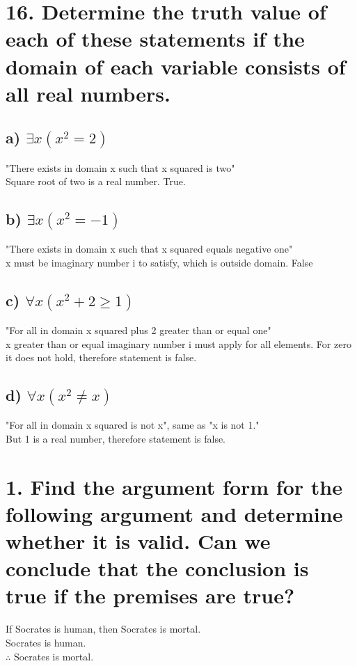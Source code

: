 \documentclass[11pt, oneside]{article} %
\numberwithin{equation}{section} %
\numberwithin{figure}{section} %
\numberwithin{table}{section} %
\begin{document}
\begin{table}[!htp]
\section{16. Determine the truth value of each of these statements if the domain of each variable consists of all real numbers.}
\subsection{a) $\exists$$x(x^2 = 2)$}
"There exists in domain x such that x squared is two"\\
Square root of two is a real number. True.
\subsection{b) $\exists$$x(x^2 = -1)$}
"There exists in domain x such that x squared equals negative one"\\
x must be imaginary number i to satisfy, which is outside domain. False
\subsection{c) $\forall$$x(x^2 + 2 \geq 1)$}
"For all in domain x squared plus 2 greater than or equal one"\\
x greater than or equal imaginary number i must apply for all elements. For zero it does not hold, therefore statement is false.   
\subsection{d) $\forall$$x(x^2 \neq x)$} 
"For all in domain x squared is not x", same as "x is not 1."\\
But 1 is a real number, therefore statement is false.
\end{table}

\begin{table}[!htp]
\section{}
\section{1. Find the argument form for the following argument and determine whether it is valid. Can we conclude that the conclusion is true if the premises are true?}

If Socrates is human, then Socrates is mortal. \\
Socrates is human.\\
$\therefore$ Socrates is mortal.

\end{table}
\end{document}
